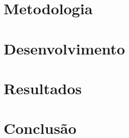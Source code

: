  
 

 
 

\section{\esp Metodologia}

\section{\esp Desenvolvimento}

\section{\esp Resultados}

\section{\esp Conclusão}









% 
